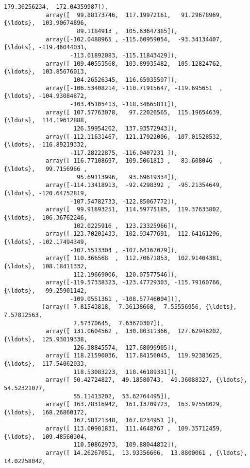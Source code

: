 \documentclass[11pt]{article}
\begin{document}
\begin{Verbatim}[commandchars=\\\{\}]
                    179.36256234,  172.04359987]),
            array([  99.88173746,  117.19972161,   91.29678969, {\ldots},  103.90674896,
                     89.1184913 ,  105.63647385]),
            array([-102.0488965 , -115.60959054,  -93.34134407, {\ldots}, -119.46044031,
                   -113.01892083, -115.11843429]),
            array([ 109.40553568,  103.89935482,  105.12824762, {\ldots},  103.85676013,
                    104.26526345,  116.65935597]),
            array([-106.53408214, -110.71915647, -119.695651  , {\ldots}, -104.93084872,
                   -103.45105413, -118.34665811]),
            array([ 107.57763078,   97.22026565,  115.19654639, {\ldots},  114.19612888,
                    126.59954202,  137.93572943]),
            array([-112.11631467, -121.17922006, -107.01528532, {\ldots}, -116.89219332,
                   -117.28222875, -116.0407231 ]),
            array([ 116.77108697,  109.5061813 ,   83.608046  , {\ldots},   99.7156966 ,
                     95.69113996,   93.69619334]),
            array([-114.13418913,  -92.4298392 ,  -95.21354649, {\ldots}, -120.64752819,
                   -107.54782733, -122.85067772]),
            array([  99.91693251,  114.59775185,  119.37633802, {\ldots},  106.36762246,
                    102.0225916 ,  123.23325966]),
            array([-123.70201433, -102.93477691, -112.64161296, {\ldots}, -102.17494349,
                   -107.5513304 , -107.64167079]),
            array([ 110.366568  ,  112.70671853,  102.91404381, {\ldots},  108.18411332,
                    112.19669006,  120.07577546]),
            array([-119.57338323, -123.47729303, -115.79160766, {\ldots},  -99.25901142,
                   -109.0551361 , -108.57746004])],
           [array([ 7.81543818,  7.36138668,  7.55556956, {\ldots},  7.57812563,
                    7.57370645,  7.63670307]),
            array([ 131.0604562 ,  130.80311366,  127.62946202, {\ldots},  125.93019338,
                    126.38845574,  127.68099905]),
            array([ 118.21590036,  117.84156045,  119.92383625, {\ldots},  117.54062033,
                    118.53083223,  118.46189331]),
            array([ 50.42724827,  49.18580743,  49.36088327, {\ldots},  54.52321077,
                    55.11413202,  53.62764495]),
            array([ 163.78316942,  161.13709723,  163.97558029, {\ldots},  168.26860172,
                    167.58121348,  167.8234951 ]),
            array([ 113.00901831,  111.4648767 ,  109.35712459, {\ldots},  109.48560304,
                    110.50862973,  109.88044832]),
            array([ 14.26267051,  13.93356666,  13.8800061 , {\ldots},  14.02258042,

\end{Verbatim}
\end{document}
